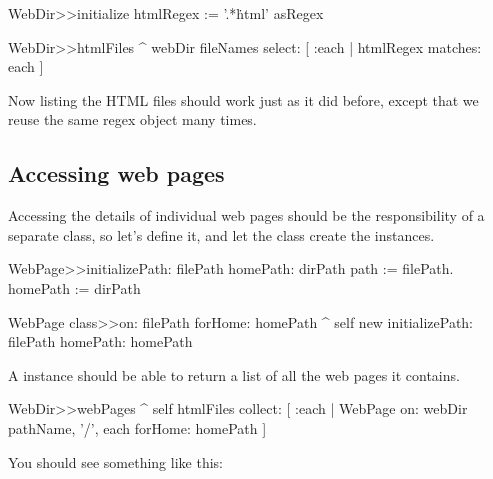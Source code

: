 \documentclass[a4paper,10pt,twoside]{book}
\begin{document}

\begin{code}{}
WebDir>>initialize
	htmlRegex := '.*\.html' asRegex

WebDir>>htmlFiles
	^ webDir fileNames select: [ :each | htmlRegex matches: each ]
\end{code}

Now listing the HTML files should work just as it did before, except that we reuse the same regex object many times.

\subsection{Accessing web pages}

Accessing the details of individual web pages should be the responsibility of a separate class, so let's define it, and let the  class create the instances.


\begin{code}{}
WebPage>>initializePath: filePath homePath: dirPath 
	path := filePath.
	homePath := dirPath

WebPage class>>on: filePath forHome: homePath
	^ self new initializePath: filePath homePath: homePath
\end{code}

A  instance should be able to return a list of all the web pages it contains.


\begin{code}{}
WebDir>>webPages
	^ self htmlFiles collect: 
		[ :each | WebPage 
			on: webDir pathName, '/', each
			forHome: homePath ]
\end{code}

You should see something like this:
\end{document}
